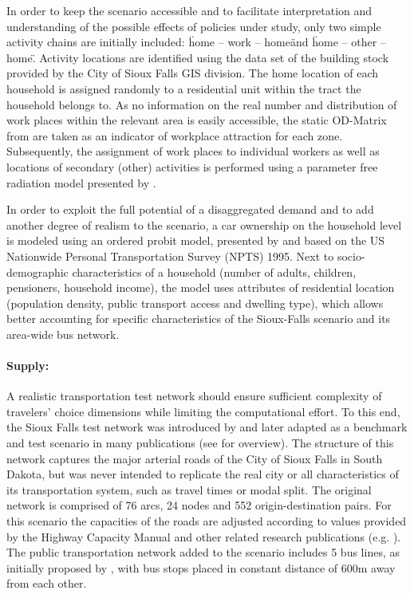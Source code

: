 In order to keep the scenario accessible and to facilitate interpretation and understanding of the possible effects of policies under study, only two simple activity chains are initially included: \"home – work – home\" and \"home – other – home\". Activity locations are identified using the data set of the building stock provided by the City of Sioux Falls GIS division. The home location of each household is assigned randomly to a residential unit within the tract the household belongs to. As no information on the real number and distribution of work places within the relevant area is easily accessible, the static OD-Matrix from \citet[][]{LeBlancEtAl_TransRes_1975} are taken as an indicator of workplace attraction for each zone. Subsequently, the assignment of work places to individual workers as well as locations of secondary (other) activities is performed using a parameter free radiation model presented by \citet[][]{SiminiEtAl_NAT_2012}.

In order to exploit the full potential of a disaggregated demand and to add another degree of realism to the scenario, a car ownership on the household level is modeled using an ordered probit model, presented by \citet[][]{GiulianoDargay_TransResA_2006} and based on the US Nationwide Personal Transportation Survey (NPTS) 1995. Next to socio-demographic characteristics of a household (number of adults, children, pensioners, household income), the model uses attributes of residential location (population density, public transport access and dwelling type), which allows better accounting for specific characteristics of the Sioux-Falls scenario and its area-wide bus network. 

\paragraph{Supply:} 

A realistic transportation test network should ensure sufficient complexity of travelers’ choice dimensions while limiting the computational effort. To this end, the Sioux Falls test network was introduced by \citet[][]{MorlokEtAl_ResRep_org-fhwa_1973} and later adapted as a benchmark and test scenario in many publications (see \citet[][]{ChakirovFourie_TechRep_FCL_2014} for overview). The structure of this network captures the major arterial roads of the City of Sioux Falls in South Dakota, but was never intended to replicate the real city or all characteristics of its transportation system, such as travel times or modal split. The original network is comprised of 76 arcs, 24 nodes and 552 origin-destination pairs. For this scenario the capacities of the roads are adjusted according to values provided by the Highway Capacity Manual \citet[][]{HCM_2010} and other related research publications (e.g. \citet[][]{NgCFSmall_Transportation_2012}). The public transportation network added to the scenario includes 5 bus lines, as initially proposed by \citet[][]{AbdulaalLeBlanc_TransScience_1979}, with bus stops placed in constant distance of 600m away from each other. 

